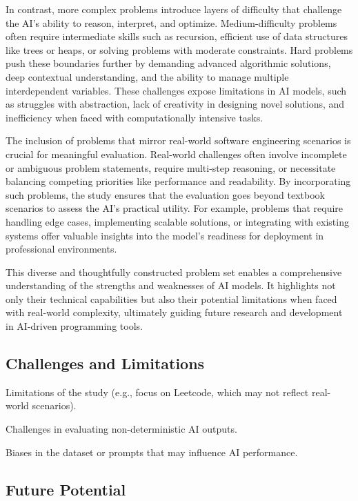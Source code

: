 In contrast, more complex problems introduce layers of difficulty that challenge the AI's ability to reason, interpret, and optimize. Medium-difficulty problems often require intermediate skills such as recursion, efficient use of data structures like trees or heaps, or solving problems with moderate constraints. Hard problems push these boundaries further by demanding advanced algorithmic solutions, deep contextual understanding, and the ability to manage multiple interdependent variables. These challenges expose limitations in AI models, such as struggles with abstraction, lack of creativity in designing novel solutions, and inefficiency when faced with computationally intensive tasks.

The inclusion of problems that mirror real-world software engineering scenarios is crucial for meaningful evaluation. Real-world challenges often involve incomplete or ambiguous problem statements, require multi-step reasoning, or necessitate balancing competing priorities like performance and readability. By incorporating such problems, the study ensures that the evaluation goes beyond textbook scenarios to assess the AI's practical utility. For example, problems that require handling edge cases, implementing scalable solutions, or integrating with existing systems offer valuable insights into the model’s readiness for deployment in professional environments.

This diverse and thoughtfully constructed problem set enables a comprehensive understanding of the strengths and weaknesses of AI models. It highlights not only their technical capabilities but also their potential limitations when faced with real-world complexity, ultimately guiding future research and development in AI-driven programming tools.
\subsection{Challenges and Limitations}

Limitations of the study (e.g., focus on Leetcode, which may not reflect real-world scenarios).

Challenges in evaluating non-deterministic AI outputs.

Biases in the dataset or prompts that may influence AI performance.

\subsection{Future Potential}

